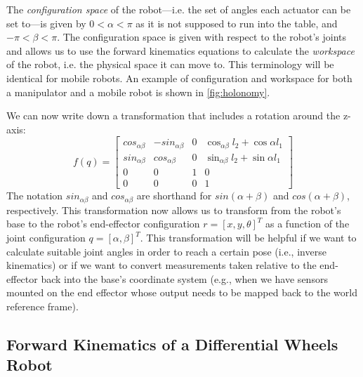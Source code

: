 The \emph{configuration space} of the robot---i.e. the set of angles each actuator can be set to---is given by $ 0 < \alpha < \pi $ as it is not supposed to run into the table, and $ -\pi < \beta < \pi$.
The configuration space is given with respect to the robot's joints and allows us to use the forward kinematics equations to calculate the \emph{workspace} of the robot, i.e. the physical space it can move to.
This terminology will be identical for mobile robots. An example of configuration and workspace for both a manipulator and a mobile robot is shown in \cref{fig:holonomy}.

We can now write down  a transformation that includes a rotation around the z-axis:
\begin{equation}
\label{eq:2armtrans}
f(q) = \left[\begin{array}{cccc}cos_{\alpha\beta} & -sin_{\alpha\beta} &  0 & \cos_{\alpha\beta}l_2+\cos\alpha l_1\\
                        sin_{\alpha\beta} & cos_{\alpha\beta} & 0 & \sin_{\alpha\beta}l_2+\sin\alpha l_1\\
                                                0 & 0 & 1 & 0\\
                                                0 & 0 & 0 & 1\end{array}\right]
\end{equation}
The notation $sin_{\alpha\beta}$ and $cos_{\alpha\beta}$ are shorthand for $sin(\alpha+\beta)$ and $cos(\alpha+\beta)$, respectively.
%
This transformation now allows us to transform from the robot's base to the robot's end-effector configuration $r = [x, y, \theta]^T$ as a function of the joint configuration $q = [\alpha, \beta]^T$.
This transformation will be helpful if we want to calculate suitable joint angles in order to reach a certain pose (i.e., inverse kinematics) or if we want to convert measurements taken relative to the end-effector back into the base's coordinate system (e.g., when we have sensors mounted on the end effector whose output needs to be mapped back to the world reference frame).

\subsection{Forward Kinematics of a Differential Wheels Robot}\label{sec:kinematics:fwk:mobile}

